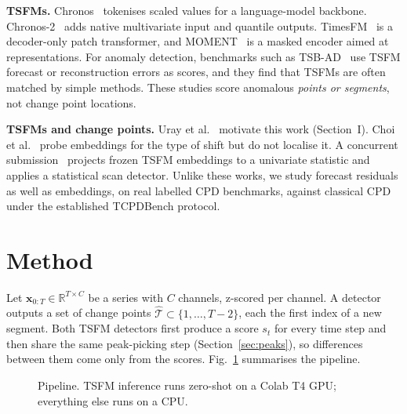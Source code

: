 \documentclass[conference]{IEEEtran}
\begin{document}
\textbf{TSFMs.} Chronos~\cite{ansari2024chronos} tokenises scaled values for a language-model backbone. Chronos-2~\cite{ansari2025chronos2} adds native multivariate input and quantile outputs. TimesFM~\cite{das2024timesfm} is a decoder-only patch transformer, and MOMENT~\cite{goswami2024moment} is a masked encoder aimed at representations. For anomaly detection, benchmarks such as TSB-AD~\cite{liu2024tsbad} use TSFM forecast or reconstruction errors as scores, and they find that TSFMs are often matched by simple methods. These studies score anomalous \emph{points or segments}, not change point locations.

\textbf{TSFMs and change points.} Uray et al.~\cite{uray2026exploring} motivate this work (Section~I). Choi et al.~\cite{choi2026nonstationarity} probe embeddings for the type of shift but do not localise it. A concurrent submission~\cite{anon2026gasfm} projects frozen TSFM embeddings to a univariate statistic and applies a statistical scan detector. Unlike these works, we study forecast residuals as well as embeddings, on real labelled CPD benchmarks, against classical CPD under the established TCPDBench protocol.

\section{Method}
Let $\mathbf{x}_{0:T}\in\mathbb{R}^{T\times C}$ be a series with $C$ channels, z-scored per channel. A detector outputs a set of change points $\hat{\mathcal{T}}\subset\{1,\dots,T-2\}$, each the first index of a new segment. Both TSFM detectors first produce a score $s_t$ for every time step and then share the same peak-picking step (Section~\ref{sec:peaks}), so differences between them come only from the scores. Fig.~\ref{fig:pipeline} summarises the pipeline.

\begin{figure}[t]
\centering
{}
\caption{Pipeline. TSFM inference runs zero-shot on a Colab T4 GPU; everything else runs on a CPU.}
\label{fig:pipeline}
\end{figure}
\end{document}
